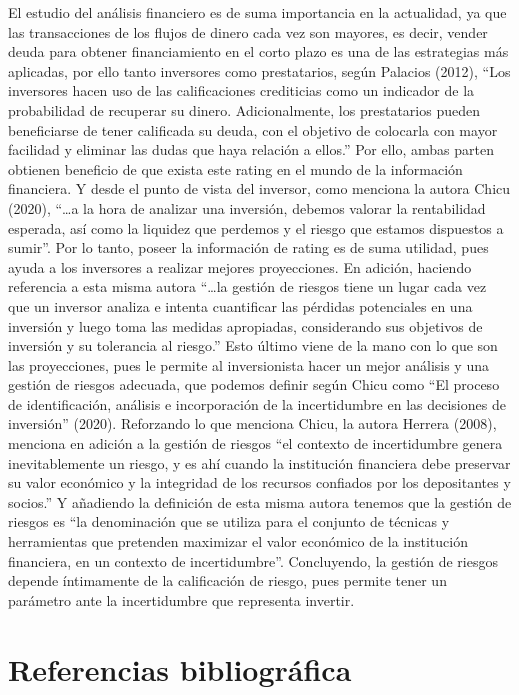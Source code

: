 \documentclass[
  letterpaper,
  DIV=11,
  numbers=noendperiod]{scrreprt}
\begin{document}
El estudio del análisis financiero es de suma importancia en la
actualidad, ya que las transacciones de los flujos de dinero cada vez
son mayores, es decir, vender deuda para obtener financiamiento en el
corto plazo es una de las estrategias más aplicadas, por ello tanto
inversores como prestatarios, según Palacios (2012), ``Los inversores
hacen uso de las calificaciones crediticias como un indicador de la
probabilidad de recuperar su dinero. Adicionalmente, los prestatarios
pueden beneficiarse de tener calificada su deuda, con el objetivo de
colocarla con mayor facilidad y eliminar las dudas que haya relación a
ellos.'' Por ello, ambas parten obtienen beneficio de que exista este
rating en el mundo de la información financiera. Y desde el punto de
vista del inversor, como menciona la autora Chicu (2020), ``\ldots a la
hora de analizar una inversión, debemos valorar la rentabilidad
esperada, así como la liquidez que perdemos y el riesgo que estamos
dispuestos a sumir''. Por lo tanto, poseer la información de rating es
de suma utilidad, pues ayuda a los inversores a realizar mejores
proyecciones. En adición, haciendo referencia a esta misma autora
``\ldots la gestión de riesgos tiene un lugar cada vez que un inversor
analiza e intenta cuantificar las pérdidas potenciales en una inversión
y luego toma las medidas apropiadas, considerando sus objetivos de
inversión y su tolerancia al riesgo.'' Esto último viene de la mano con
lo que son las proyecciones, pues le permite al inversionista hacer un
mejor análisis y una gestión de riesgos adecuada, que podemos definir
según Chicu como ``El proceso de identificación, análisis e
incorporación de la incertidumbre en las decisiones de inversión''
(2020). Reforzando lo que menciona Chicu, la autora Herrera (2008),
menciona en adición a la gestión de riesgos ``el contexto de
incertidumbre genera inevitablemente un riesgo, y es ahí cuando la
institución financiera debe preservar su valor económico y la integridad
de los recursos confiados por los depositantes y socios.'' Y añadiendo
la definición de esta misma autora tenemos que la gestión de riesgos es
``la denominación que se utiliza para el conjunto de técnicas y
herramientas que pretenden maximizar el valor económico de la
institución financiera, en un contexto de incertidumbre''. Concluyendo,
la gestión de riesgos depende íntimamente de la calificación de riesgo,
pues permite tener un parámetro ante la incertidumbre que representa
invertir.

\section{Referencias bibliográfica}\label{referencias-bibliogruxe1fica}
\end{document}
